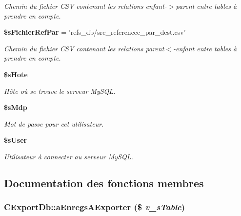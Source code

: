 \begin{CompactItemize}
\begin{CompactList}\small\item\em Chemin du fichier CSV contenant les relations enfant-$>$parent entre tables à prendre en compte. \item\end{CompactList}\item 
{\bf \$sFichierRefPar} = 'refs\_\-db/src\_\-referencee\_\-par\_\-dest.csv'\label{class_c_export_db_a5438890b469def893d7985ce743bc6d}

\begin{CompactList}\small\item\em Chemin du fichier CSV contenant les relations parent$<$-enfant entre tables à prendre en compte. \item\end{CompactList}\item 
{\bf \$sHote}\label{class_c_export_db_1a0e935d64f2905014803974adf09d62}

\begin{CompactList}\small\item\em Hôte où se trouve le serveur MySQL. \item\end{CompactList}\item 
{\bf \$sMdp}\label{class_c_export_db_6fcad6eaa8c95d7b1710d70560c78cc0}

\begin{CompactList}\small\item\em Mot de passe pour cet utilisateur. \item\end{CompactList}\item 
{\bf \$sUser}\label{class_c_export_db_60bb5baff822e69bb1d49fedffbcc1db}

\begin{CompactList}\small\item\em Utilisateur à connecter au serveur MySQL. \item\end{CompactList}\end{CompactItemize}


\subsection{Documentation des fonctions membres}
\subsubsection{\setlength{\rightskip}{0pt plus 5cm}CExportDb::aEnregsAExporter (\$ {\em v\_\-sTable})}\label{class_c_export_db_ecd67c4b1bc102ef89473d6a34d81c1d}


